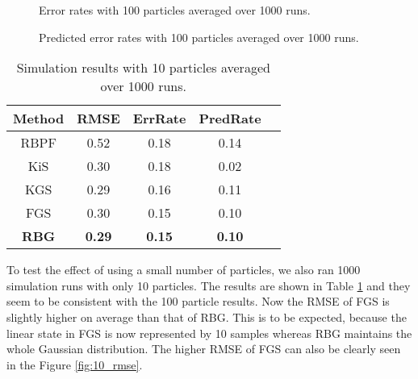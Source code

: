 \documentclass[twocolumn]{autart}    %
\begin{document}
\begin{figure}[htb!]
\begin{center}
\end{center}
\caption{Error rates with 100 particles averaged over 1000 runs.}
\label{fig:100_err}
\end{figure}

\begin{figure}[htb!]
\begin{center}
\end{center}
\caption{Predicted error rates with 100 particles averaged over 1000
  runs.}
\label{fig:100_errp}
\end{figure}

%
\begin{table}[htb]
\begin{center}
\begin{tabular}{|c|c|c|c|c|}
\hline
Method & RMSE              & ErrRate       &   PredRate \\
\hline
\hline
RBPF   & 0.52 & 0.18 & 0.14 \\ \hline
KiS    & 0.30 & 0.18 & 0.02 \\ \hline
KGS    & 0.29 & 0.16 & 0.11 \\ \hline
FGS    & 0.30 & 0.15 & 0.10 \\ \hline
{\bf RBG} & {\bf 0.29} & {\bf 0.15} & {\bf 0.10} \\ \hline
\end{tabular}
\end{center}
\caption{Simulation results with 10 particles averaged over 1000 runs. }
\label{tbl:res10}
\end{table}

To test the effect of using a small number of particles, we also ran
1000 simulation runs with only 10 particles. The results are shown in
Table \ref{tbl:res10} and they seem to be consistent with the 100
particle results. Now the RMSE of FGS is slightly higher on average
than that of RBG. This is to be expected, because the linear state in
FGS is now represented by 10 samples whereas RBG maintains the whole
Gaussian distribution. The higher RMSE of FGS can also be clearly seen
in the Figure \ref{fig:10_rmse}.
\end{document}
